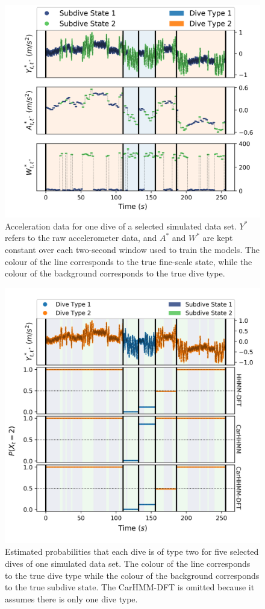 \begin{figure}[ht]
	\centering
	\includegraphics[width=5in]{../Plots/sim_data.png}
	\caption{Acceleration data for one dive of a selected simulated data set. $Y^*$ refers to the raw accelerometer data, and $A^*$ and $W^*$ are kept constant over each two-second window used to train the models. The colour of the line corresponds to the true fine-scale state, while the colour of the background corresponds to the true dive type.}
	\label{fig:sim_data}
\end{figure}

\begin{figure}[ht]
    \centering
    \includegraphics[width=4.5in]{../Plots/Posterior_Coarse_States.png}
    \caption{Estimated probabilities that each dive is of type two for five selected dives of one simulated data set. The colour of the line corresponds to the true dive type while the colour of the background corresponds to the true subdive state. The CarHMM-DFT is omitted because it assumes there is only one dive type.}
    \label{fig:acc_coarse}
\end{figure}

